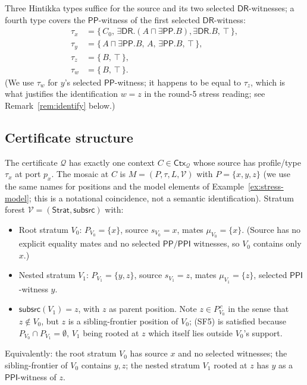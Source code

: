 \documentclass[11pt]{article}
\theoremstyle{definition}
\theoremstyle{remark}
\newcommand{\DR}{\mathsf{DR}}
\newcommand{\PP}{\mathsf{PP}}
\newcommand{\PPI}{\mathsf{PPI}}
\newcommand{\Ctx}{\mathsf{Ctx}}
\newcommand{\Q}{\mathcal{Q}}
\newcommand{\Stratum}{\mathsf{Strat}}
\newcommand{\Subsrc}{\mathsf{subsrc}}
\begin{document}
Three Hintikka types suffice for the source and its two selected
$\DR$-witnesses; a fourth type covers the $\PP$-witness of the first
selected $\DR$-witness:
\begin{align*}
  \tau_x &= \{\,C_0,\,\exists\DR.(A\sqcap\exists\PP.B),
              \exists\DR.B,\,\top\,\},\\
  \tau_y &= \{\,A\sqcap\exists\PP.B,\,A,\,\exists\PP.B,\,\top\,\},\\
  \tau_z &= \{\,B,\,\top\,\},\\
  \tau_w &= \{\,B,\,\top\,\}.
\end{align*}
(We use $\tau_w$ for $y$'s selected $\PP$-witness; it happens to be
equal to $\tau_z$, which is what justifies the identification
$w=z$ in the round-5 stress reading; see Remark~\ref{rem:identify}
below.)

\subsection{Certificate structure}

The certificate $\Q$ has exactly one context $C\in\Ctx_\Q$ whose
source has profile/type $\tau_x$ at port $p_x$.  The mosaic at $C$ is
$M=(P,\tau,L,\mathcal V)$ with $P=\{x,y,z\}$ (we use the same names
for positions and the model elements of
Example~\ref{ex:stress-model}; this is a notational coincidence, not
a semantic identification).  Stratum forest
$\mathcal V=(\Stratum,\Subsrc)$ with:
\begin{itemize}
\item Root stratum $V_0$: $P_{V_0}=\{x\}$, source $s_{V_0}=x$, mates
  $\mu_{V_0}=\{x\}$.  (Source has no explicit equality mates and no
  selected $\PP/\PPI$ witnesses, so $V_0$ contains only $x$.)
\item Nested stratum $V_1$: $P_{V_1}=\{y,z\}$, source $s_{V_1}=z$,
  mates $\mu_{V_1}=\{z\}$, selected $\PPI$-witness $y$.
\item $\Subsrc(V_1)=z$, with $z$ as parent position.  Note
  $z\in P_{V_0}^{\,c}$ in the sense that $z\notin V_0$, but $z$ is a
  sibling-frontier position of $V_0$; (SF5) is satisfied because
  $P_{V_0}\cap P_{V_1}=\emptyset$, $V_1$ being rooted at $z$ which
  itself lies outside $V_0$'s support.
\end{itemize}

Equivalently: the root stratum $V_0$ has source $x$ and no selected
witnesses; the sibling-frontier of $V_0$ contains $y,z$; the nested
stratum $V_1$ rooted at $z$ has $y$ as a $\PPI$-witness of $z$.
\end{document}
